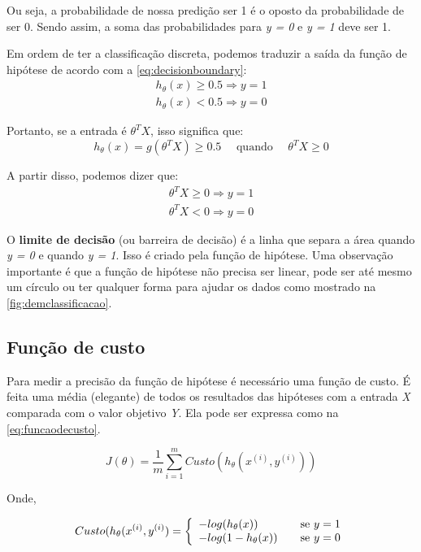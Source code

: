 Ou seja, a probabilidade de nossa predição ser 1 é o oposto da probabilidade de ser 0. Sendo assim, a soma das probabilidades para \textit{y = 0} e \textit{y = 1} deve ser 1.

Em ordem de ter a classificação discreta, podemos traduzir a saída da função de hipótese de acordo com a \autoref{eq:decisionboundary}:
\begin{align} 
h_{\theta}(x) \geq 0.5 \Rightarrow y = 1 \nonumber \\
h_{\theta}(x) < 0.5 \Rightarrow y = 0 \label{eq:decisionboundary}
\end{align}

Portanto, se a entrada é $\theta^TX$, isso significa que:
\begin{equation}
h_{\theta}(x) = g(\theta^TX) \geq 0.5 \quad \text{ quando } \quad \theta^TX \geq 0 \nonumber
\end{equation}

A partir disso, podemos dizer que:
\begin{align}
\theta^TX \geq 0 \Rightarrow y = 1 \nonumber \\
\theta^TX < 0 \Rightarrow y = 0 \nonumber
\end{align}

O \textbf{limite de decisão} (ou barreira de decisão) é a linha que separa a área quando \textit{y = 0} e quando \textit{y = 1}. Isso é criado pela função de hipótese. Uma observação importante é que a função de hipótese não precisa ser linear, pode ser até mesmo um círculo ou ter qualquer forma para ajudar os dados como mostrado na \autoref{fig:demclassificacao}.


\subsection{Função de custo}

Para medir a precisão da função de hipótese é necessário uma função de custo. É feita uma média (elegante) de todos os resultados das hipóteses com a entrada \textit{X} comparada com o valor objetivo \textit{Y}. Ela pode ser expressa como na \autoref{eq:funcaodecusto}.

\begin{equation}
\label{eq:funcaodecusto}
J(\theta) = \frac{1}{m}\sum\limits_{i=1}^{m}Custo(h_{\theta}(x^{(i)}, y^{(i)}))
\end{equation}

Onde,


\begin{align}
 Custo(h_{\theta}(x^{(i)}, y^{(i)}) = \left\{
  \begin{array}{l l} 
    -log(h_{\theta}(x)) & \quad \text{se } y=1 \\
    -log(1 - h_{\theta}(x)) & \quad \text{se } y=0 \label{eq:funcaocusto}
  \end{array} \right.
\end{align}


